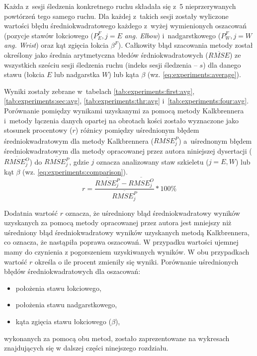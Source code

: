 Każda z~sesji śledzenia konkretnego ruchu składała się z~5 nieprzerywanych powtórzeń tego samego ruchu. Dla każdej z~takich sesji zostały wyliczone wartości błędu średniokwadratowego każdego z~wyżej wymienionych oszacowań (pozycje stawów łokciowego ($P^F_E, j = E$  \emph{ang. Elbow}) i~nadgarstkowego ($P^F_W, j = W$ \emph{ang. Wrist}) oraz kąt zgięcia łokcia $\beta^F$). Całkowity błąd szacowania metody został określony jako średnia arytmetyczna błedów śrdniokwadratowych ($\overline{RMSE}$) ze wszystkich sześciu sesji śledzenia ruchu (indeks sesji śledzenia -- $s$) dla danego stawu (łokcia $E$ lub nadgarstka $W$) lub kąta $\beta$ (wz. \ref{eq:experiments:average}).

Wyniki zostały zebrane w~tabelach \ref{tab:experiments:first:avg}, \ref{tab:experiments:sec:avg}, \ref{tab:experiments:thr:avg} i~\ref{tab:experiments:four:avg}. Porównanie pomiędzy wynikami uzyskanymi za pomocą metody Kalkbrennera i~metody łączenia danych opartej na obrotach kości zostało wyznaczone jako stosunek procentowy ($r$) różnicy pomiędzy uśrednionym błędem średniokwadratowym dla metody Kalkbrennera ($\overline{RMSE^P_j}$) a~uśrednonym błędem średniokwadratowym dla metody opracowanej przez autora niniejszej dysertacji ($\overline{RMSE^O_j}$) do $\overline{RMSE^P_j}$, gdzie $j$ oznacza analizowany staw szkieletu ($j=E, W$) lub kąt $\beta$ (wz. \ref{eq:experiments:comparison}). \\
						
\begin{equation}
	r = \frac{\overline{RMSE^P_j} - \overline{RMSE^O_j}}{\overline{RMSE^P_j}} * 100\%
	\label{eq:experiments:comparison}
\end{equation}
						
Dodatnia wartość $r$ oznacza, że uśredniony błąd średniokwadratowy wyników uzyskanych za pomocą metody opracowanej przez autora jest mniejszy niż uśredniony błąd średniokwadratowy wyników uzyskanych metodą Kalkbrennera, co oznacza, że nastąpiła poprawa oszacowań. W przypadku wartości ujemnej mamy do czynienia z pogorszeniem uzyskiwanych wyników. W obu przypadkach wartość $r$ określa o ile procent zmieniły się wyniki. Porównanie uśrednionych błędów średniokwadratowych dla oszacowań:
\begin{itemize}
	\item położenia stawu łokciowego,
	\item położenia stawu nadgarstkowego,
	\item kąta zgięcia stawu łokciowego ($\beta$),
\end{itemize}
wykonanych za pomocą obu metod, zostało zaprezentowane na wykresach znajdujących się w dalszej części ninejszego rozdziału.
						
